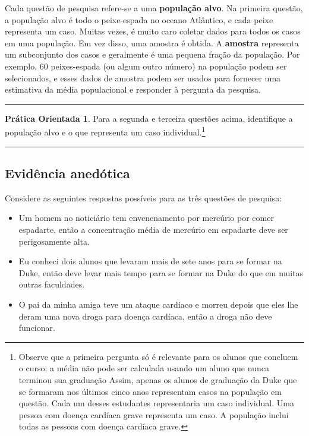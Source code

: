 \documentclass[
]{book}
\theoremstyle{definition}
\theoremstyle{definition}
\theoremstyle{definition}
\newtheorem{exercise}{Prática Orientada}[chapter]
\theoremstyle{definition}
\theoremstyle{remark}
\begin{document}
Cada questão de pesquisa refere-se a uma \textbf{população alvo}. Na primeira questão, a população alvo é todo o peixe-espada no oceano Atlântico, e cada peixe representa um caso. Muitas vezes, é muito caro coletar dados para todos os casos em uma população. Em vez disso, uma amostra é obtida. A \textbf{amostra} representa um subconjunto dos casos e geralmente é uma pequena fração da população. Por exemplo, 60 peixes-espada (ou algum outro número) na população podem ser selecionados, e esses dados de amostra podem ser usados para fornecer uma estimativa da média populacional e responder à pergunta da pesquisa.

\begin{center}\rule{0.5\linewidth}{0.5pt}\end{center}

\begin{exercise}
\protect\hypertarget{exr:identifyingThePopulationForTwoQuestionsInPopAndSampSubsection}{}{\label{exr:identifyingThePopulationForTwoQuestionsInPopAndSampSubsection} }Para a segunda e terceira questões acima, identifique a população alvo e o que representa um caso individual.\footnote{Observe que a primeira pergunta só é relevante para os alunos que concluem o curso; a média não pode ser calculada usando um aluno que nunca terminou sua graduação Assim, apenas os alunos de graduação da Duke que se formaram nos últimos cinco anos representam casos na população em questão. Cada um desses estudantes representaria um caso individual. Uma pessoa com doença cardíaca grave representa um caso. A população inclui todas as pessoas com doença cardíaca grave.}
\end{exercise}

\begin{center}\rule{0.5\linewidth}{0.5pt}\end{center}

\hypertarget{anecdotalEvidenceSubsection}{%
\subsection{Evidência anedótica}\label{anecdotalEvidenceSubsection}}

Considere as seguintes respostas possíveis para as três questões de pesquisa:

\begin{itemize}
\item
  Um homem no noticiário tem envenenamento por mercúrio por comer espadarte, então a concentração média de mercúrio em espadarte deve ser perigosamente alta.
\item
  Eu conheci dois alunos que levaram mais de sete anos para se formar na Duke, então deve levar mais tempo para se formar na Duke do que em muitas outras faculdades.
\item
  O pai da minha amiga teve um ataque cardíaco e morreu depois que eles lhe deram uma nova droga para doença cardíaca, então a droga não deve funcionar.
\end{itemize}
\end{document}
